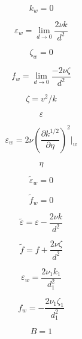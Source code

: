\begin{equation}
k_w = 0
\end{equation}

\begin{equation}
\varepsilon_w = \lim_{d\to0}{\frac{2 \nu k}{d^2}}
\end{equation}

\begin{equation}
\zeta_w = 0
\end{equation}

\begin{equation}
f_w = \lim_{d\to0}{\frac{-2 \nu \zeta}{d^2}}
\end{equation}

\begin{equation}
\zeta = v^2 / k
\end{equation}

\begin{equation}
\varepsilon
\end{equation}

\begin{equation}
\varepsilon_w = 2 \nu \left( \frac{\partial k^{1/2}}{\partial \eta} \right)^2 |_w
\end{equation}

\begin{equation}
\eta
\end{equation}

\begin{equation}
\tilde \varepsilon_w = 0
\end{equation}

\begin{equation}
\tilde f_w = 0
\end{equation}

\begin{equation}
\tilde \varepsilon = \varepsilon - \frac{2 \nu k}{d^2}
\end{equation}

\begin{equation}
\tilde f = f + \frac{2 \nu \zeta}{d^2}
\end{equation}

\begin{equation}
\varepsilon_w = \frac{2 \nu_1 k_1}{d_1^2}
\end{equation}

\begin{equation}
f_w = -\frac{2 \nu_1 \zeta_1}{d_1^2}
\end{equation}

\begin{equation}
B=1
\end{equation}


